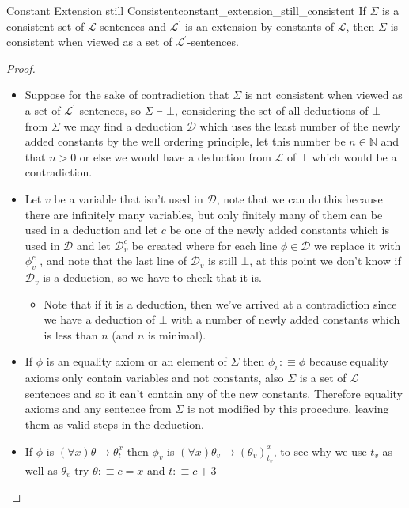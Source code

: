 \begin{lemma}{Constant Extension still Consistent}{constant_extension_still_consistent}
If $\Sigma$ is a consistent set of $\mathcal{L}$-sentences and $\mathcal{L}^{\prime}$ is an extension by constants of $\mathcal{L}$, then $\Sigma$ is consistent when viewed as a set of $\mathcal{L}^{\prime}$-sentences.
\end{lemma}
\begin{proof}
    \begin{itemize}
        \item Suppose for the sake of contradiction that $ \Sigma  $ is not consistent when viewed as a set of $\mathcal{L}^{\prime}$-sentences, so $ \Sigma \vdash \bot $, considering the set of all deductions of $ \bot  $ from $ \Sigma  $ we may find a deduction $ \mathcal{ D }   $  which uses the least number of the newly added constants by the well ordering principle, let this number be $ n \in  \mathbb{N} $ and that $ n > 0 $ or else we would have a deduction from $ \mathcal{ L }   $ of $ \bot  $ which would be a contradiction.
        \item Let $ v $ be a variable that isn't used in $ \mathcal{ D }   $, note that we can do this because there are infinitely many variables, but only finitely many of them can be used in a deduction and let $ c $ be one of the newly added constants which is used in $ \mathcal{ D }   $ and let $ \mathcal{ D } _{ v } ^{ c }    $ be created where for each line $ \phi \in  \mathcal{ D }  $ we replace it with $ \phi _{ v }^{ c } $ , and note that the last line of $ \mathcal{ D } _{ v }   $ is still $ \bot  $, at this point we don't know if $ \mathcal{ D } _{ v }   $ is a deduction, so we have to check that it is.
        \begin{itemize}
            \item Note that if it is a deduction, then we've arrived at a contradiction since we have a deduction of $ \bot  $ with a number of newly added constants which is less than $ n $ (and $ n $ is minimal).
        \end{itemize}
        \item If $ \phi  $ is an equality axiom or an element of $ \Sigma $ then $ \phi _{ v } :\equiv \phi  $ because equality axioms only contain variables and not constants, also $ \Sigma  $ is a set of $ \mathcal{ L }   $ sentences and so it can't contain any of the new constants. Therefore equality axioms and any sentence from $ \Sigma  $ is not modified by this procedure, leaving them as valid steps in the deduction.
        \item If $ \phi  $ is $ \left( \forall x \right) \theta \rightarrow \theta _{ t }^{ x }  $ then $ \phi _{ v }  $ is $ \left( \forall x \right)\theta _{ v } \rightarrow \left( \theta _{ v }  \right) _{ t _{ v }  }^{ x  }  $, to see why we use $ t _{ v }  $ as well as $ \theta _{ v }  $ try $ \theta :\equiv c =  x $ and $ t :\equiv   c + 3 $ 
    \end{itemize}
\end{proof}
